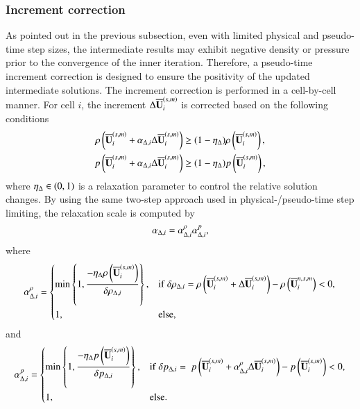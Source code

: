 \subsubsection{Increment correction}
\label{ssec:increment-correction}

As pointed out in the previous subsection, even with limited physical and pseudo-time step sizes, the intermediate results may exhibit negative density or pressure prior to the convergence of the inner iteration.
Therefore, a pseudo-time increment correction is designed to ensure the positivity of the updated intermediate solutions. The increment correction is performed in a cell-by-cell manner.
For cell $i$, the increment $\mathrm\Delta \overline{\mathbf{U}}_i^{\left(s,m\right)}$ is corrected based on the following conditions
\begin{equation}
    \label{eq:ppLimitInc}
    \begin{aligned}
        \rho\left(\overline{\mathbf{U}}_i^{\left(s,m\right)} + \alpha_{\mathrm\Delta,i} \mathrm\Delta \overline{\mathbf{U}}_i^{\left(s,m\right)}\right)
         & \geq
        (1- \eta_\mathrm\Delta)
        \rho\left(\overline{\mathbf{U}}_i^{\left(s,m\right)}\right), \\
        p\left(\overline{\mathbf{U}}_i^{\left(s,m\right)} + \alpha_{\mathrm\Delta,i} \mathrm\Delta \overline{\mathbf{U}}_i^{\left(s,m\right)}\right)
         & \geq
        (1- \eta_\mathrm\Delta)
        p\left(\overline{\mathbf{U}}_i^{\left(s,m\right)}\right),
    \end{aligned}
\end{equation}
where $\eta_\mathrm\Delta \in (0,1)$ is a relaxation parameter to control the relative solution changes.
By using the same two-step approach used in physical-/pseudo-time step limiting, the relaxation scale is computed by
\begin{equation}
\label{eq:alpha-inc}
    \alpha_{\mathrm\Delta,i}= \alpha_{\mathrm\Delta,i}^{\rho} \alpha_{\mathrm\Delta,i}^{p},
\end{equation}
where
\begin{equation}
\label{eq:alpha-inc-rho}
    \alpha_{\mathrm\Delta,i}^{\rho} = \begin{dcases}
        \min\left\{1, \dfrac{-\eta_\mathrm\Delta \rho\left(\overline{\mathbf{U}}^{\left(s,m\right)}_i\right)}{\delta \rho_{\mathrm\Delta,i}} \right\}, & \mathrm{if} \ \delta \rho_{\mathrm\Delta,i} = \rho\left(\overline{\mathbf{U}}^{\left(s,m\right)}_i +\mathrm\Delta \overline{\mathbf{U}}_i^{\left(s,m\right)}\right)  -\rho\left(\overline{\mathbf{U}}^{n,s,m}_i\right) < 0, \\
        1, &
        \mathrm{else},
    \end{dcases}
\end{equation}
and
\begin{equation}
\label{eq:alpha-inc-p}
    \alpha_{\mathrm\Delta,i}^{p} = \begin{dcases}
        \min\left\{1, \dfrac{-\eta_\mathrm\Delta p \left(\overline{\mathbf{U}}^{\left(s,m\right)}_i\right)}{\delta p_{\mathrm\Delta,i}} \right\}, & \mathrm{if} \ \delta p_{\mathrm\Delta,i} = \ p \left(\overline{\mathbf{U}}^{\left(s,m\right)}_i + \alpha_{\mathrm\Delta,i}^{\rho} \mathrm\Delta \overline{\mathbf{U}}_i^{\left(s,m\right)}\right) - p \left(\overline{\mathbf{U}}^{\left(s,m\right)}_i\right) < 0, \\
        1, &
        \mathrm{else}.
    \end{dcases}
\end{equation}
